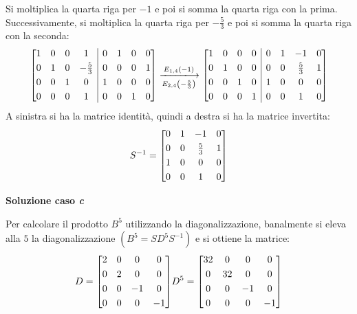 \documentclass[a4paper]{article}
\makeatletter
\newenvironment{rowequmatbra}[1]{\left[\array{@{}#1@{}}}{\endarray\right]}
\makeatother
\begin{document}
	Si moltiplica la quarta riga per $-1$ e poi si somma la quarta riga con la prima. Successivamente, si moltiplica la quarta riga per $-\frac{5}{3}$ e poi si somma la quarta riga con la seconda:
	\begin{equation*}
		\begin{rowequmatbra}{cccc|cccc}
			1 & 0 & 0 & 1 & 0 & 1 & 0 & 0 \\ [0.3em]
			0 & 1 & 0 & -\frac{5}{3} & 0 & 0 & 0 & 1 \\ [0.3em]
			0 & 0 & 1 & 0 & 1 & 0 & 0 & 0 \\ [0.3em]
			0 & 0 & 0 & 1 & 0 & 0 & 1 & 0
		\end{rowequmatbra}
		\xlongrightarrow[E_{2,4}\left(-\frac{5}{3}\right)] {E_{1,4}\left(-1\right)}
		\begin{rowequmatbra}{cccc|cccc}
			1 & 0 & 0 & 0 & 0 & 1 & -1 & 0 \\ [0.3em]
			0 & 1 & 0 & 0 & 0 & 0 & \frac{5}{3} & 1 \\ [0.3em]
			0 & 0 & 1 & 0 & 1 & 0 & 0 & 0 \\ [0.3em]
			0 & 0 & 0 & 1 & 0 & 0 & 1 & 0
		\end{rowequmatbra}
	\end{equation*}
	A sinistra si ha la matrice identità, quindi a destra si ha la matrice invertita:
	\begin{equation*}
		S^{-1} = \begin{rowequmatbra}{cccc}
			0 & 1 & -1 & 0 \\ [0.3em]
			0 & 0 & \frac{5}{3} & 1 \\ [0.3em]
			1 & 0 & 0 & 0 \\ [0.3em]
			0 & 0 & 1 & 0
		\end{rowequmatbra}
	\end{equation*}
	
	\noindent
	\textcolor{Green4}{\textbf{Soluzione caso \emph{c}}}\newline
	
	\noindent
	Per calcolare il prodotto $B^{5}$ utilizzando la diagonalizzazione, banalmente si eleva alla $5$ la diagonalizzazione $\left(B^{5} = SD^{5}S^{-1}\right)$ e si ottiene la matrice:
	\begin{equation*}
		D = \begin{rowequmatbra}{cccc}
			2 & 0 & 0 & 0 \\ [0.3em]
			0 & 2 & 0 & 0 \\ [0.3em]
			0 & 0 & -1 & 0 \\ [0.3em]
			0 & 0 & 0 & -1
		\end{rowequmatbra}
		D^{5} = \begin{rowequmatbra}{cccc}
			32 & 0 & 0 & 0 \\ [0.3em]
			0 & 32 & 0 & 0 \\ [0.3em]
			0 & 0 & -1 & 0 \\ [0.3em]
			0 & 0 & 0 & -1
		\end{rowequmatbra}
	\end{equation*}\newpage
	
\end{document}

